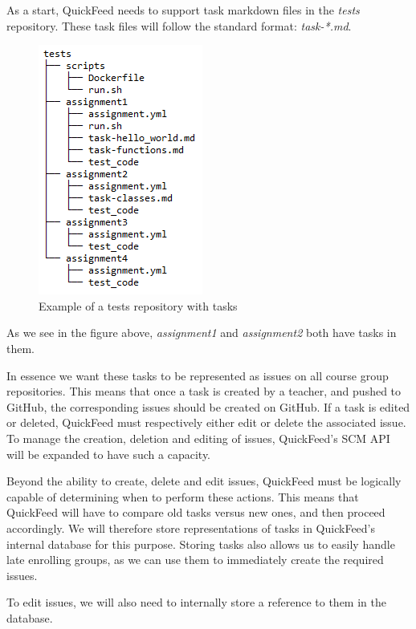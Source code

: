 As a start, QuickFeed needs to support task markdown files in the \textit{tests} repository.
These task files will follow the standard format: \textit{task-*.md}.

\begin{figure}[ht]
    \centering
    \includegraphics[scale=0.8]{photos/tests-repository-structure-tasks.PNG}
    \caption{Example of a tests repository with tasks}
    \label{fig:tests-repository-structure-tasks}
\end{figure}

As we see in the figure above, \textit{assignment1} and \textit{assignment2} both have tasks in them.

In essence we want these tasks to be represented as issues on all course group repositories.
This means that once a task is created by a teacher, and pushed to GitHub, the corresponding issues should be created on GitHub.
If a task is edited or deleted, QuickFeed must respectively either edit or delete the associated issue.
To manage the creation, deletion and editing of issues, QuickFeed's SCM API will be expanded to have such a capacity.

Beyond the ability to create, delete and edit issues, QuickFeed must be logically capable of determining when to perform these actions.
This means that QuickFeed will have to compare old tasks versus new ones, and then proceed accordingly.
We will therefore store representations of tasks in QuickFeed's internal database for this purpose.
Storing tasks also allows us to easily handle late enrolling groups, as we can use them to immediately create the required issues.

To edit issues, we will also need to internally store a reference to them in the database.

